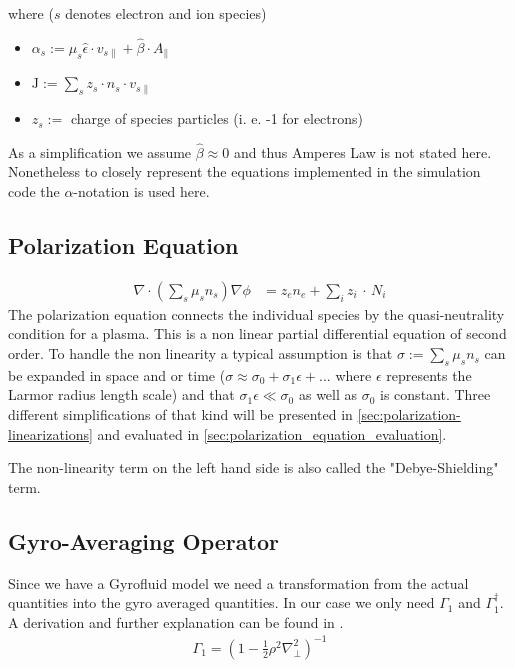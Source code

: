 \documentclass[master.tex]{subfiles}
\begin{document}
where ($s$ denotes electron and ion species)

\begin{itemize}
    \item $\alpha_s := \mu_s \hat{\epsilon} \cdot v_{s\parallel} + \hat{\beta} \cdot A_{\parallel}$
    \item $\mathrm{J} := \sum_s z_s \cdot n_s \cdot v_{s\parallel}$
    \item $z_s :=$ charge of species particles (i. e. -1 for electrons)
\end{itemize}

As a simplification we assume $\hat{\beta} \approx 0$ and thus Amperes Law is not stated here. Nonetheless to closely represent the equations implemented in the simulation code the $\alpha$-notation is used here.

\subsection{Polarization Equation}

\begin{align}
    \nabla \cdot \left( \sum_s \mu_s n_s \right) \nabla \phi &= z_e n_e + \sum_i z_i \, \cdot \, N_i \label{eq:polarization}
\end{align}
The polarization equation connects the individual species by the quasi-neutrality condition for a plasma. This is a non linear partial differential equation of second order. To handle the non linearity a typical assumption is that $\sigma := \sum_s \mu_s n_s$ can be expanded in space and or time ($\sigma \approx \sigma_0 + \sigma_1 \epsilon + ...$ where $\epsilon$ represents the Larmor radius length scale) and that $\sigma_1 \epsilon \ll \sigma_0$ as well as $\sigma_0$ is constant. Three different simplifications of that kind will be presented in \autoref{sec:polarization-linearizations} and evaluated in \autoref{sec:polarization_equation_evaluation}. 


\begin{blockquote}
    The non-linearity term on the left hand side is also called the "Debye-Shielding" term.
\end{blockquote}

\subsection{Gyro-Averaging Operator}
Since we have a Gyrofluid model we need a transformation from the actual quantities into the gyro averaged quantities. In our case we only need $\Gamma_1$ and $\Gamma_1^\dagger$. A derivation and further explanation can be found in \cite{HeldDisseration}.
\begin{align}
    \label{eq:gyro-averaging-opeartor}
    \Gamma_1 = \left(1- \frac{1}{2} \rho^2 \nabla_\perp^2\right)^{-1}
\end{align}
\end{document}
